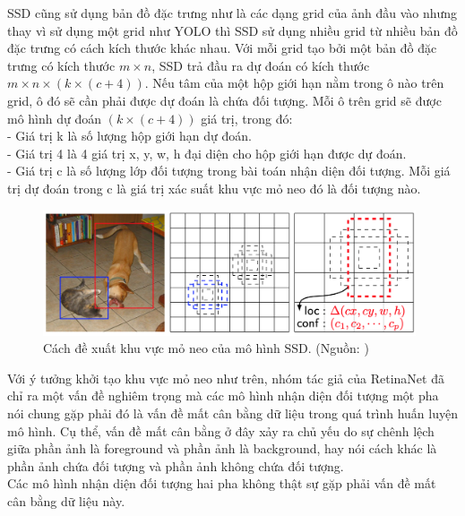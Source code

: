 {    \noindent
    SSD cũng sử dụng bản đồ đặc trưng như là các dạng grid của ảnh đầu vào nhưng thay vì sử dụng một grid như YOLO thì SSD sử dụng nhiều grid từ nhiều bản đồ đặc trưng có cách kích thước khác nhau.
    Với mỗi grid tạo bởi một bản đồ đặc trưng có kích thước $m × n$, SSD trả đầu ra dự đoán có kích thước $m × n × (k × (c + 4))$.
    Nếu tâm của một hộp giới hạn nằm trong ô nào trên grid, ô đó sẽ cần phải được dự đoán là chứa đối tượng.
    Mỗi ô trên grid sẽ được mô hình dự đoán $(k × (c + 4))$ giá trị, trong đó: \\
    - Giá trị k là số lượng hộp giới hạn dự đoán. \\
    - Giá trị 4 là 4 giá trị x, y, w, h đại diện cho hộp giới hạn được dự đoán. \\
    - Giá trị c là số lượng lớp đối tượng trong bài toán nhận diện đối tượng.
    Mỗi giá trị dự đoán trong c là giá trị xác suất khu vực mỏ neo đó là đối tượng nào.

    \begin{figure}[H]
        \centering
        \includegraphics[width=11cm] {images/ssd_anchor}
        \caption{Cách đề xuất khu vực mỏ neo của mô hình SSD. (Nguồn: \cite{liu2016ssd})}
        \label{fig:ssd_anchor}
    \end{figure}

    \noindent
    Với ý tưởng khởi tạo khu vực mỏ neo như trên, nhóm tác giả của RetinaNet đã chỉ ra một vấn đề nghiêm trọng mà các mô hình nhận diện đối tượng một pha nói chung gặp phải đó là vấn đề mất cân bằng dữ liệu trong quá trình huấn luyện mô hình.
    Cụ thể, vấn đề mất cân bằng ở đây xảy ra chủ yếu do sự chênh lệch giữa phần ảnh là foreground và phần ảnh là background, hay nói cách khác là phần ảnh chứa đối tượng và phần ảnh không chứa đối tượng. \\
    Các mô hình nhận diện đối tượng hai pha không thật sự gặp phải vấn đề mất cân bằng dữ liệu này.

}
